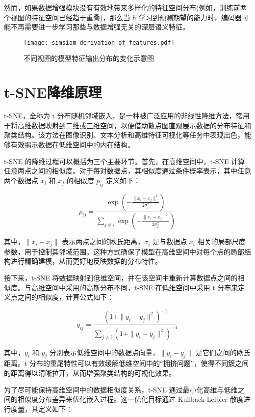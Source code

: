 \documentclass[master]{thesis-uestc}
\begin{document}
然而，如果数据增强模块没有有效地带来多样化的特征空间分布(例如，训练前两个视图的特征空间已经趋于重叠)，那么当 \( h \) 学习到预测期望的能力时，编码器可能不再需要进一步学习那些与数据增强无关的深层语义特征。

\begin{figure}[h]
    \centering
    \texttt{[image: simsiam\_derivation\_of\_features.pdf]}
    \caption{不同视图的模型特征输出分布的变化示意图}
    \label{simsiam_derivation_of_features}
\end{figure}

\section{t-SNE降维原理}
t-SNE，全称为 t 分布随机邻域嵌入，是一种被广泛应用的非线性降维方法，常用于将高维数据映射到二维或三维空间，以便借助散点图直观展示数据的分布特征和聚类结构。该方法在图像识别、文本分析和高维特征可视化等任务中表现出色，能够有效揭示数据在低维空间中的内在结构。

t-SNE 的降维过程可以概括为三个主要环节。首先，在高维空间中，t-SNE 计算任意两点之间的相似度。对于每对数据点，其相似度通过条件概率表示，其中任意两个数据点 \(x_i\) 和 \(x_j\) 的相似度 \(p_{ij}\) 定义如下：

\begin{equation}
p_{ij} = \frac{\exp\left( -\frac{\|x_i - x_j\|^2}{2\sigma_i^2} \right)}{\sum_{j \neq i} \exp\left( -\frac{\|x_i - x_j\|^2}{2\sigma_i^2} \right)}
\end{equation}

其中，\(\|x_i - x_j\|\) 表示两点之间的欧氏距离，\(\sigma_i\) 是与数据点 \(x_i\) 相关的局部尺度参数，用于控制其邻域范围。这种方式确保了模型在高维空间中对每个点的局部结构进行精确建模，从而更好地反映数据的分布特性。

接下来，t-SNE 将数据映射到低维空间，并在该空间中重新计算数据点之间的相似度。与高维空间中采用的高斯分布不同，t-SNE 在低维空间中采用 t 分布来定义点之间的相似度，计算公式如下：

\begin{equation}
q_{ij} = \frac{\left( 1 + \|y_i - y_j\|^2 \right)^{-1}}{\sum_{j \neq i} \left( 1 + \|y_i - y_j\|^2 \right)^{-1}}
\end{equation}

其中，\(y_i\) 和 \(y_j\) 分别表示低维空间中的数据点向量，\(\|y_i - y_j\|\) 是它们之间的欧氏距离。t 分布的重尾特性可以有效缓解低维空间中的“拥挤问题”，使得不同簇之间的距离得以清晰拉开，从而增强聚类结构的可视化效果。

为了尽可能保持高维空间中的数据相似度关系，t-SNE 通过最小化高维与低维之间的相似度分布差异来优化嵌入过程。这一优化目标通过 Kullback-Leibler 散度进行度量，其定义如下：
\end{document}
